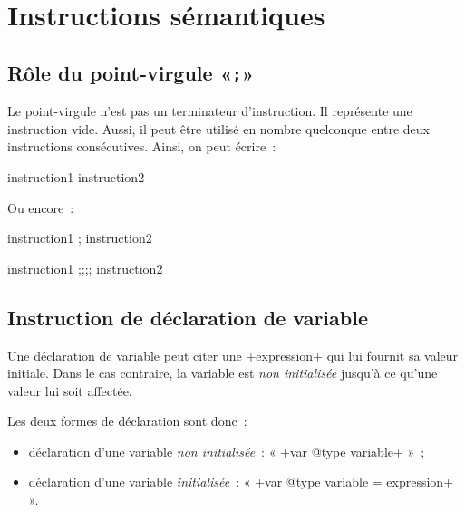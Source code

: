 
\chapter{Instructions sémantiques}






\section{Rôle du point-virgule «\texttt{;}»}

Le point-virgule n'est pas un terminateur d'instruction. Il représente une instruction vide. Aussi, il peut être utilisé en nombre quelconque entre deux instructions consécutives. Ainsi, on peut écrire~:

\begin{galgas3}
instruction1  instruction2
\end{galgas3}

Ou encore~:
\begin{galgas3}
instruction1 ; instruction2
\end{galgas3}
\begin{galgas3}
instruction1 ;;;; instruction2
\end{galgas3}







\section{Instruction de déclaration de variable}


Une déclaration de variable peut citer une \ggst+expression+ qui lui fournit sa valeur initiale. Dans le cas contraire, la variable est \emph{non initialisée} jusqu'à ce qu'une valeur lui soit affectée.

Les deux formes de déclaration sont donc~:
\begin{itemize}
\item déclaration d'une variable \emph{non initialisée}~: « \ggst+var @type variable+ »~;
\item déclaration d'une variable \emph{initialisée}~: « \ggst+var @type variable = expression+ ».
\end{itemize}



